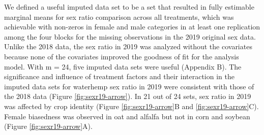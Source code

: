 \documentclass[utf8]{frontiersSCNS}
\begin{document}
We defined a useful imputed data set to be a set that resulted in fully estimable marginal means for sex ratio comparison across all treatments, which was achievable with non-zeros in female and male categories in at least one replication among the four blocks for the missing observations in the 2019 original sex data. Unlike the 2018 data, the sex ratio in 2019 was analyzed without the covariates because none of the covariates improved the goodness of fit for the analysis model. With m = 24, five imputed data sets were useful (Appendix B). The significance and influence of treatment factors and their interaction in the imputed data sets for waterhemp sex ratio in 2019 were consistent with those of the 2018 data (Figure \ref{fig:sexr19-arrow}). In 21 out of 24 sets, sex ratio in 2019 was affected by crop identity (Figure \ref{fig:sexr19-arrow}B and \ref{fig:sexr19-arrow}C). Female biasedness was observed in oat and alfalfa but not in corn and soybean (Figure \ref{fig:sexr19-arrow}A).
\end{document}
